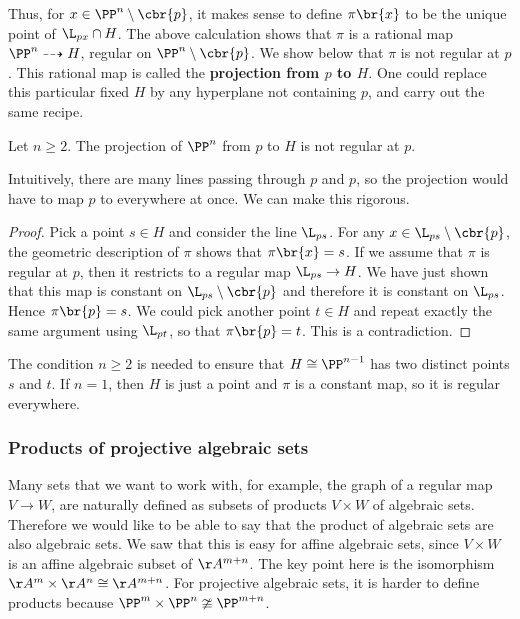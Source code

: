 Thus, for $ x \in \PP^n \setminus \cbr{p} $, it makes sense to define $ \pi\br{x} $ to be the unique point of $ \L_{px} \cap H $. The above calculation shows that $ \pi $ is a rational map $ \PP^n \dashrightarrow H $, regular on $ \PP^n \setminus \cbr{p} $. We show below that $ \pi $ is not regular at $ p $. This rational map is called the \textbf{projection from $ p $ to $ H $}. One could replace this particular fixed $ H $ by any hyperplane not containing $ p $, and carry out the same recipe.

\begin{lemma}
Let $ n \ge 2 $. The projection of $ \PP^n $ from $ p $ to $ H $ is not regular at $ p $.
\end{lemma}

Intuitively, there are many lines passing through $ p $ and $ p $, so the projection would have to map $ p $ to everywhere at once. We can make this rigorous.

\begin{proof}
Pick a point $ s \in H $ and consider the line $ \L_{ps} $. For any $ x \in \L_{ps} \setminus \cbr{p} $, the geometric description of $ \pi $ shows that $ \pi\br{x} = s $. If we assume that $ \pi $ is regular at $ p $, then it restricts to a regular map $ \L_{ps} \to H $. We have just shown that this map is constant on $ \L_{ps} \setminus \cbr{p} $ and therefore it is constant on $ \L_{ps} $. Hence $ \pi\br{p} = s $. We could pick another point $ t \in H $ and repeat exactly the same argument using $ \L_{pt} $, so that $ \pi\br{p} = t $. This is a contradiction.
\end{proof}

The condition $ n \ge 2 $ is needed to ensure that $ H \cong \PP^{n - 1} $ has two distinct points $ s $ and $ t $. If $ n = 1 $, then $ H $ is just a point and $ \pi $ is a constant map, so it is regular everywhere.

\subsubsection{Products of projective algebraic sets}

Many sets that we want to work with, for example, the graph of a regular map $ V \to W $, are naturally defined as subsets of products $ V \times W $ of algebraic sets. Therefore we would like to be able to say that the product of algebraic sets are also algebraic sets. We saw that this is easy for affine algebraic sets, since $ V \times W $ is an affine algebraic subset of $ \AA^{m + n} $. The key point here is the isomorphism $ \AA^m \times \AA^n \cong \AA^{m + n} $. For projective algebraic sets, it is harder to define products because $ \PP^m \times \PP^n \ncong \PP^{m + n} $.


